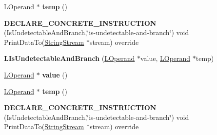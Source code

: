 \begin{DoxyCompactItemize}
\item 
\hyperlink{classv8_1_1internal_1_1_l_operand}{L\+Operand} $\ast$ {\bfseries temp} ()\hypertarget{classv8_1_1internal_1_1_l_is_undetectable_and_branch_abc3e4f5ebade89f5f49c3e6e416e9c1d}{}\label{classv8_1_1internal_1_1_l_is_undetectable_and_branch_abc3e4f5ebade89f5f49c3e6e416e9c1d}

\item 
{\bfseries D\+E\+C\+L\+A\+R\+E\+\_\+\+C\+O\+N\+C\+R\+E\+T\+E\+\_\+\+I\+N\+S\+T\+R\+U\+C\+T\+I\+ON} (Is\+Undetectable\+And\+Branch,\char`\"{}is-\/undetectable-\/and-\/branch\char`\"{}) void Print\+Data\+To(\hyperlink{classv8_1_1internal_1_1_string_stream}{String\+Stream} $\ast$stream) override\hypertarget{classv8_1_1internal_1_1_l_is_undetectable_and_branch_a28ae934f22deb295f07eed93dfd358ba}{}\label{classv8_1_1internal_1_1_l_is_undetectable_and_branch_a28ae934f22deb295f07eed93dfd358ba}

\item 
{\bfseries L\+Is\+Undetectable\+And\+Branch} (\hyperlink{classv8_1_1internal_1_1_l_operand}{L\+Operand} $\ast$value, \hyperlink{classv8_1_1internal_1_1_l_operand}{L\+Operand} $\ast$temp)\hypertarget{classv8_1_1internal_1_1_l_is_undetectable_and_branch_a48333769d21d80135872b3e667e8c882}{}\label{classv8_1_1internal_1_1_l_is_undetectable_and_branch_a48333769d21d80135872b3e667e8c882}

\item 
\hyperlink{classv8_1_1internal_1_1_l_operand}{L\+Operand} $\ast$ {\bfseries value} ()\hypertarget{classv8_1_1internal_1_1_l_is_undetectable_and_branch_aea79e90e070e85f96e2dca54b3b26773}{}\label{classv8_1_1internal_1_1_l_is_undetectable_and_branch_aea79e90e070e85f96e2dca54b3b26773}

\item 
\hyperlink{classv8_1_1internal_1_1_l_operand}{L\+Operand} $\ast$ {\bfseries temp} ()\hypertarget{classv8_1_1internal_1_1_l_is_undetectable_and_branch_abc3e4f5ebade89f5f49c3e6e416e9c1d}{}\label{classv8_1_1internal_1_1_l_is_undetectable_and_branch_abc3e4f5ebade89f5f49c3e6e416e9c1d}

\item 
{\bfseries D\+E\+C\+L\+A\+R\+E\+\_\+\+C\+O\+N\+C\+R\+E\+T\+E\+\_\+\+I\+N\+S\+T\+R\+U\+C\+T\+I\+ON} (Is\+Undetectable\+And\+Branch,\char`\"{}is-\/undetectable-\/and-\/branch\char`\"{}) void Print\+Data\+To(\hyperlink{classv8_1_1internal_1_1_string_stream}{String\+Stream} $\ast$stream) override\hypertarget{classv8_1_1internal_1_1_l_is_undetectable_and_branch_a28ae934f22deb295f07eed93dfd358ba}{}\label{classv8_1_1internal_1_1_l_is_undetectable_and_branch_a28ae934f22deb295f07eed93dfd358ba}

\end{DoxyCompactItemize}
